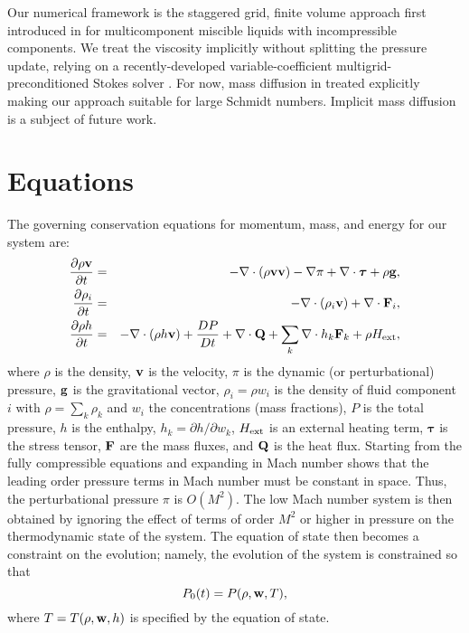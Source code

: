 \documentclass[final]{siamltex}
\def\Fb {{\bf F}}
\def\gb {{\bf g}}
\def\Qb {{\bf Q}}
\def\vb {{\bf v}}
\def\wb {{\bf w}}
\def\taub   {\boldsymbol{\tau}}
\def\Hext {H_{\rm ext}}
\begin{document}
Our numerical framework is the staggered grid, finite volume approach first
introduced in \cite{LowMachExplicit,LowMachImplicit,LowMachMulti} for
multicomponent miscible liquids with incompressible components.
We treat the viscosity implicitly without splitting the pressure
update, relying on a recently-developed variable-coefficient multigrid-preconditioned
Stokes solver \cite{StokesPreconditioners}.
For now, mass diffusion in treated explicitly making our
approach suitable for large Schmidt numbers.  Implicit mass diffusion is a subject
of future work.

\section{Equations}
The governing conservation equations for momentum, mass, and energy for our system are:
\begin{eqnarray}
\frac{\partial\rho\vb}{\partial t} &=& - \nabla\cdot(\rho\vb\vb) - \nabla\pi + \nabla\cdot\taub + \rho\gb,\label{eq:momentum}\\
\frac{\partial\rho_i}{\partial t} &=& -\nabla\cdot(\rho_i\vb) + \nabla\cdot \Fb_i,\label{eq:mass}\\
\frac{\partial\rho h}{\partial t} &=& -\nabla\cdot(\rho h\vb) + \frac{DP}{Dt} + \nabla\cdot\Qb + \sum_k \nabla\cdot h_k \Fb_k + \rho\Hext,\label{eq:enthalpy}
\end{eqnarray}
where $\rho$ is the density, $\vb$ is the velocity, $\pi$ is the dynamic 
(or perturbational) pressure, $\gb$ is the gravitational vector, $\rho_i=\rho w_i$ is
the density of fluid component $i$ with $\rho = \sum_k\rho_k$ and $w_i$ the 
concentrations (mass fractions), $P$ is the total
pressure, $h$ is the enthalpy, $h_k = \partial h/\partial w_k$,
$\Hext$ is an external heating term, $\taub$ is the stress tensor,
$\Fb$ are the mass fluxes, and $\Qb$ is the heat flux.
Starting from the fully compressible equations and expanding in Mach number shows 
that the leading order pressure terms in Mach number must be constant in space. 
Thus, the perturbational pressure $\pi$ is $O(M^2)$.
The low Mach number system is then obtained by ignoring the effect of terms of 
order $M^2$ or higher in pressure  on the thermodynamic state of the system.
The equation of state then becomes a constraint on the evolution; namely,
the evolution of the system is constrained so that
\begin{equation}
P_0(t) = P(\rho,\wb,T),\label{eq:EOS}
\end{equation}
where $T=T(\rho,\wb,h)$ is specified by the equation of state.\\
\end{document}
